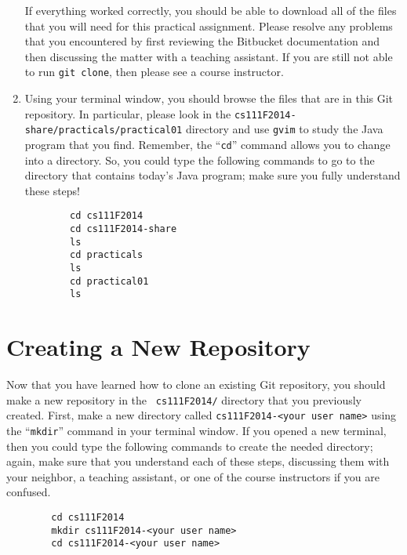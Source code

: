 \begin{enumerate}
    If everything worked correctly, you should be able to download all of the files that you will need for this
    practical assignment. Please resolve any problems that you encountered by first reviewing the Bitbucket
    documentation and then discussing the matter with a teaching assistant.  If you are still not able to run {\tt git
      clone}, then please see a course instructor.

  \item Using your terminal window, you should browse the files that are in this Git repository.  In particular, please
    look in the {\tt cs111F2014-share/practicals/practical01} directory and use {\tt gvim} to study the Java program that
    you find.  Remember, the ``{\tt cd}'' command allows you to change into a directory. So, you could type the following
    commands to go to the directory that contains today's Java program; make sure you fully understand these steps!

    \vspace*{-.1in}
    \begin{verbatim}
        cd cs111F2014
        cd cs111F2014-share
        ls
        cd practicals
        ls
        cd practical01
        ls
    \end{verbatim}
    \vspace*{-.2in}

    \end{enumerate}

\section*{Creating a New Repository}

Now that you have learned how to clone an existing Git repository, you should make a new repository in the {\tt
  cs111F2014/} directory that you previously created.  First, make a new directory called {\tt cs111F2014-<your user
  name>} using the ``{\tt mkdir}'' command in your terminal window. If you opened a new terminal, then you could type
the following commands to create the needed directory; again, make sure that you understand each of these steps,
discussing them with your neighbor, a teaching assistant, or one of the course instructors if you are confused.

    \vspace*{-.1in}
    \begin{verbatim}
        cd cs111F2014
        mkdir cs111F2014-<your user name>
        cd cs111F2014-<your user name>
    \end{verbatim}
    \vspace*{-.1in}

